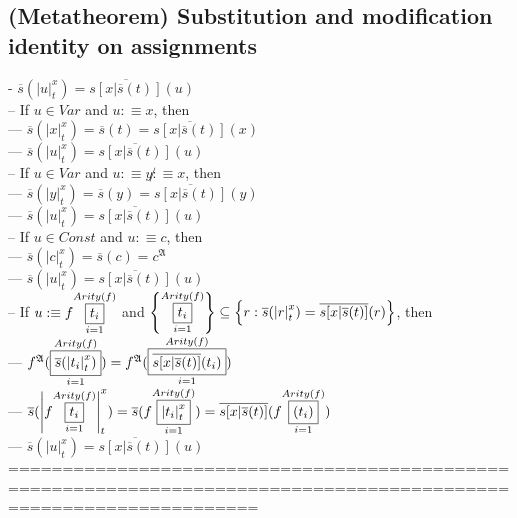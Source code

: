 \documentclass{book}
\newcommand{\is}{:\equiv}
\newcommand{\inot}{\not}
\newcommand{\means}[2]{#1^{#2}}
\newcommand{\extend}[1]{\overline{#1}}
\newcommand{\set}[1]{\left\{ #1 \right\}}
\newcommand{\vdc}[3]{\underset{#2}{\overset{#3}{\fbox{$#1$}}}}
\newcommand{\sub}[3]{\left|#1\right|_{#3}^{#2}}
\begin{document}
\subsection{(Metatheorem) Substitution and modification identity on assignments} %
	- $\extend{s}(\sub{u}{x}{t}) = \extend{s[x|\extend{s}(t)]}(u)$ \\
		-- If $u \in Var$ and $u \is x$, then \\
			--- $\extend{s}(\sub{x}{x}{t}) = \extend{s}(t) = \extend{s[x|\extend{s}(t)]}(x)$ \\
			--- $\extend{s}(\sub{u}{x}{t}) = \extend{s[x|\extend{s}(t)]}(u)$ \\
		-- If $u \in Var$ and $u \is y \inot \is x$, then \\
			--- $\extend{s}(\sub{y}{x}{t}) = \extend{s}(y) = \extend{s[x|\extend{s}(t)]}(y)$ \\
			--- $\extend{s}(\sub{u}{x}{t}) = \extend{s[x|\extend{s}(t)]}(u)$ \\
		-- If $u \in Const$ and $u \is c$, then \\
			--- $\extend{s}(\sub{c}{x}{t}) = \extend{s}(c) = \means{c}{\mathfrak{A}}$ \\
			--- $\extend{s}(\sub{u}{x}{t}) = \extend{s[x|\extend{s}(t)]}(u)$ \\
		-- If $u \is f \vdc{t_i}{i=1}{Arity(f)}$ and $\set{\vdc{t_i}{i=1}{Arity(f)}} \subseteq \set{r: \extend{s}(\sub{r}{x}{t}) = \extend{s[x|\extend{s}(t)]}(r)}$, then \\
			--- $\means{f}{\mathfrak{A}}(\vdc{\extend{s}(\sub{t_i}{x}{t})}{i=1}{Arity(f)}) = \means{f}{\mathfrak{A}}(\vdc{\extend{s[x|\extend{s}(t)]}(t_i)}{i=1}{Arity(f)})$ \\
			--- $\extend{s}(\sub{f \vdc{t_i}{i=1}{Arity(f)}}{x}{t}) = \extend{s}(f \vdc{\sub{t_i}{x}{t}}{i=1}{Arity(f)}) = \extend{s[x|\extend{s}(t)]}(f \vdc{(t_i)}{i=1}{Arity(f)})$ \\
			--- $\extend{s}(\sub{u}{x}{t}) = \extend{s[x|\extend{s}(t)]}(u)$ \\
	===================================================================================================================
\end{document}
